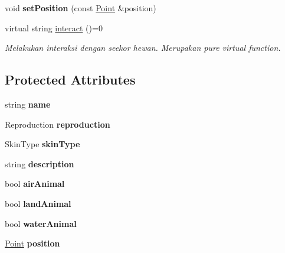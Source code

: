 \begin{DoxyCompactItemize}
\item 
\hypertarget{classAnimal_a19098b52e5a13d59a020564c98ab18e9}{void {\bfseries set\+Position} (const \hyperlink{classPoint}{Point} \&position)}\label{classAnimal_a19098b52e5a13d59a020564c98ab18e9}

\item 
virtual string \hyperlink{classAnimal_af2d9616bd719adff241a27bd1ba64725}{interact} ()=0
\begin{DoxyCompactList}\small\item\em Melakukan interaksi dengan seekor hewan. Merupakan pure virtual function. \end{DoxyCompactList}\end{DoxyCompactItemize}
\subsection*{Protected Attributes}
\begin{DoxyCompactItemize}
\item 
\hypertarget{classAnimal_a9cf3bfd9070daec7b3bbc87cbd958f35}{string {\bfseries name}}\label{classAnimal_a9cf3bfd9070daec7b3bbc87cbd958f35}

\item 
\hypertarget{classAnimal_a6662f1a4924469e59b07bab5cdf6e4cb}{Reproduction {\bfseries reproduction}}\label{classAnimal_a6662f1a4924469e59b07bab5cdf6e4cb}

\item 
\hypertarget{classAnimal_a26bf2c81eb76bf25c7d5dc1580270f28}{Skin\+Type {\bfseries skin\+Type}}\label{classAnimal_a26bf2c81eb76bf25c7d5dc1580270f28}

\item 
\hypertarget{classAnimal_a6424e69ec32a75ea293430d4f9e9e30a}{string {\bfseries description}}\label{classAnimal_a6424e69ec32a75ea293430d4f9e9e30a}

\item 
\hypertarget{classAnimal_a38e2249e3bdaf81afa7ca48e11be8630}{bool {\bfseries air\+Animal}}\label{classAnimal_a38e2249e3bdaf81afa7ca48e11be8630}

\item 
\hypertarget{classAnimal_a1a1861bf8610740a24e1cb6dfbd2c06c}{bool {\bfseries land\+Animal}}\label{classAnimal_a1a1861bf8610740a24e1cb6dfbd2c06c}

\item 
\hypertarget{classAnimal_a4f231ab99c669e08504c712bd6676a1d}{bool {\bfseries water\+Animal}}\label{classAnimal_a4f231ab99c669e08504c712bd6676a1d}

\item 
\hypertarget{classAnimal_a2628af9716d1069eb3ddf82b29065214}{\hyperlink{classPoint}{Point} {\bfseries position}}\label{classAnimal_a2628af9716d1069eb3ddf82b29065214}

\end{DoxyCompactItemize}



